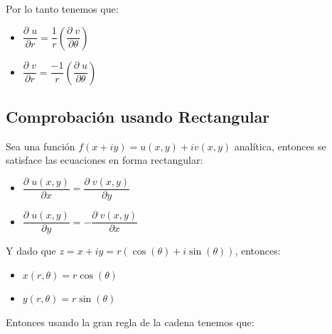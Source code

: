 \documentclass[12pt, fleqn]{report}                             %
\newcommand{\Wrap}[1]{\left( #1 \right)}                        %
\newcommand{\Cos}[1]{\cos\Wrap{#1}}                             %
\newcommand{\Sin}[1]{\sin\Wrap{#1}}                             %
\newcommand \Cis[1]  {\Cos{#1} + i \Sin{#1}}                    %
\newcommand \Partial[2]                                        %
        {\dfrac{\partial \; #1}{\partial #2}}                      %
\begin{document}
                Por lo tanto tenemos que:
                \begin{itemize}
                    \item $\Partial{u}{r} = \dfrac{1}{r} \Wrap{\Partial{v}{\theta}} $
                    \item $\Partial{v}{r} = \dfrac{-1}{r}\Wrap{\Partial{u}{\theta}} $
                \end{itemize}



            \clearpage
            \subsection{Comprobación usando Rectangular}

                Sea una función $f(x+iy) = u(x, y) + iv(x, y)$ analítica, entonces se
                satisface las ecuaciones en forma rectangular:

                \begin{itemize}
                    \item $\Partial{u(x, y)}{x} =   \Partial{v(x, y)}{y}$
                    \item $\Partial{u(x, y)}{y} = - \Partial{v(x, y)}{x}$
                \end{itemize}

                Y dado que $z = x + iy = r(\Cis{\theta})$, entonces:

                \begin{itemize}
                    \item $x(r, \theta) = r\Cos{\theta}$
                    \item $y(r, \theta) = r\Sin{\theta}$
                \end{itemize}

                Entonces usando la gran regla de la cadena tenemos que:
\end{document}
